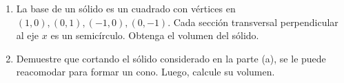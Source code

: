 \item 
\begin{enumerate}
    \item[(a)] La base de un sólido es un cuadrado con vértices en $(1, 0), (0, 1), (-1, 0), (0, -1)$. Cada sección transversal perpendicular al eje $x$ es un semicírculo. Obtenga el volumen del sólido.
    \item[(b)] Demuestre que cortando el sólido considerado en la parte (a), se le puede reacomodar para formar un cono. Luego, calcule su volumen.
\end{enumerate}
